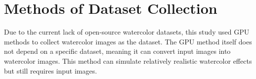 \documentclass[12pt]{report}
\begin{document}

\section{Methods of Dataset Collection }
Due to the current lack of open-source watercolor datasets, this study used GPU methods to collect watercolor images as the dataset. The GPU method itself does not depend on a specific dataset, meaning it can convert input images into watercolor images. This method can simulate relatively realistic watercolor effects but still requires input images.
\end{document}
